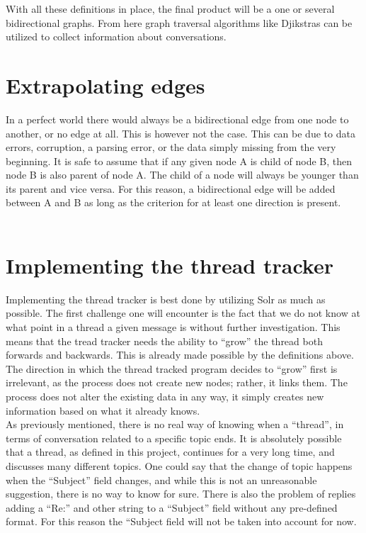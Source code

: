 \documentclass[a4paper,english]{report}
\begin{document}
With all these definitions in place, the final product will be a one or several bidirectional graphs. From here graph traversal algorithms like Djikstras can be utilized to collect information about conversations.

\section{Extrapolating edges} 

In a perfect world there would always be a bidirectional edge from one node to another, or no edge at all. This is however not the case. This can be due to data errors, corruption, a parsing error, or the data simply missing from the very beginning. 
It is safe to assume that  if any given node A is child of node B, then node B is also parent of node A. The child of a node will always be younger than its parent and vice versa. 
For this reason, a bidirectional edge will be added between A and B as long as the criterion for at least one direction is present. \\\\







\section{Implementing the thread tracker} 

Implementing the thread tracker is best done by utilizing Solr as much as possible. The first challenge one will encounter is the fact that we do not know at what point in a thread a given message is without further investigation.
This means that the tread tracker needs the ability to “grow” the thread both forwards and backwards. This is already made possible by the definitions above.\\

The direction in which the thread tracked program decides to “grow” first is irrelevant, as the process does not create new nodes; rather, it links them. The process does not alter the existing data in any way, it simply creates new information based on what it already knows.\\

As previously mentioned, there is no real way of knowing when a “thread”, in terms of conversation related to a specific topic ends. It is absolutely possible that a thread, as defined in this project, continues for a very long time, and discusses many different topics.
One could say that the change of topic happens when the “Subject” field changes, and while this is not an unreasonable suggestion, there is no way to know for sure. There is also the problem of replies adding a “Re:” and other string to a “Subject” field without any pre-defined format. For this reason the “Subject field will not be taken into account for now.\\
\end{document}
